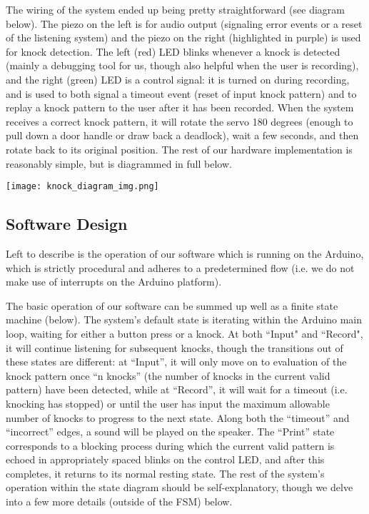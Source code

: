 \documentclass[11pt]{article}			%
\begin{document}
The wiring of the system ended up being pretty straightforward (see diagram below). The piezo on the left is for audio output (signaling error events or a reset of the listening system) and the piezo on the right (highlighted in purple) is used for knock detection. The left (red) LED blinks whenever a knock is detected (mainly a debugging tool for us, though also helpful when the user is recording), and the right (green) LED is a control signal: it is turned on during recording, and is used to both signal a timeout event (reset of input knock pattern) and to replay a knock pattern to the user after it has been recorded. When the system receives a correct knock pattern, it will rotate the servo 180 degrees (enough to pull down a door handle or draw back a deadlock), wait a few seconds, and then rotate back to its original position. The rest of our hardware implementation is reasonably simple, but is diagrammed in full below.

\begin{center}
\texttt{[image: knock\_diagram\_img.png]}
\end{center}

\subsection{Software Design}

Left to describe is the operation of our software which is running on the Arduino, which is strictly procedural and adheres to a predetermined flow (i.e. we do not make use of interrupts on the Arduino platform).

The basic operation of our software can be summed up well as a finite state machine (below). The system's default state is iterating within the Arduino main loop, waiting for either a button press or a knock. At both ``Input" and ``Record", it will continue listening for subsequent knocks, though the transitions out of these states are different: at ``Input'', it will only move on to evaluation of the knock pattern once ``n knocks'' (the number of knocks in the current valid pattern) have been detected, while at ``Record'', it will wait for a timeout (i.e. knocking has stopped) or until the user has input the maximum allowable number of knocks to progress to the next state. Along both the ``timeout'' and ``incorrect'' edges, a sound will be played on the speaker. The ``Print'' state corresponds to a blocking process during which the current valid pattern is echoed in appropriately spaced blinks on the control LED, and after this completes, it returns to its normal resting state. The rest of the system's operation within the state diagram should be self-explanatory, though we delve into a few more details (outside of the FSM) below.
\end{document}
